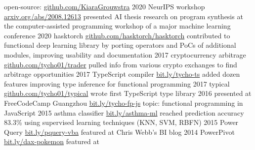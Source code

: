 \documentclass[]{friggeri-cv}
\begin{document}
\begin{entrylist}
\entry
    {}
    {open-source: }
    {\href{https://www.github.com/KiaraGrouwstra}{github.com/KiaraGrouwstra}}
    {}
   \entry
     {2020}
     {NeurIPS workshop}
     {\href{https://arxiv.org/abs/2008.12613}{arxiv.org/abs/2008.12613}}
     {
         presented AI thesis research on program synthesis at the computer-assisted programming workshop of a major machine learning conference
     }
  \entry
    {2020}
    {hasktorch}
    {\href{https://github.com/hasktorch/hasktorch}{github.com/hasktorch/hasktorch}}
    {
      contributed to functional deep learning library by porting operators and PoCs of additional modules, improving usability and documentation
    }
  \entry
    {2017}
    {cryptocurrency arbitrage}
    {\href{https://github.com/KiaraGrouwstra/trader}{github.com/tycho01/trader}}
    {
      pulled info from various crypto exchanges to find arbitrage opportunities
    }
  \entry
    {2017}
    {TypeScript compiler}
    {\href{https://github.com/Microsoft/TypeScript/pulls/KiaraGrouwstra}{bit.ly/tycho-ts}}
    {
      added dozen features improving type inference for functional programming
    }
  \entry
    {2017}
    {typical}
    {\href{https://github.com/KiaraGrouwstra/typical}{github.com/tycho01/typical}}
    {
      wrote first TypeScript type library
    }
  \entry
    {2016}
    {
      presented at
      FreeCodeCamp Guangzhou
    }
    {\href{https://www.slideshare.net/TychoGrouwstra/fp-in-js}{bit.ly/tycho-fp-js}}
    {topic: functional programming in JavaScript}
  \entry
    {2015}
    {
      asthma
      classifier
      \normalfont{}
    }
    {\href{http://bit.ly/asthma-ml}{bit.ly/asthma-ml}}
    {
      reached prediction accuracy 83.3\% using supervised learning techniques (KNN, SVM, RBFN)
    }
  \entry
    {2015}
    {
      Power Query 
    }
    {\href{https://blog.crossjoin.co.uk/2015/06/10/power-queryexcel-2016-vba-examples/}{bit.ly/pquery-vba}}
    {
      featured at
      Chris Webb's BI blog
    }
  \entry
    {2014}
    {
      PowerPivot 
    }
    {\href{https://powerpivotpro.com/2014/02/optimal-set-selection-power-pivot-does-pokemon-and-my-brain-just-exploded/}{bit.ly/dax-pokemon}}
    {
      featured at
}
\end{entrylist}
\end{document}

